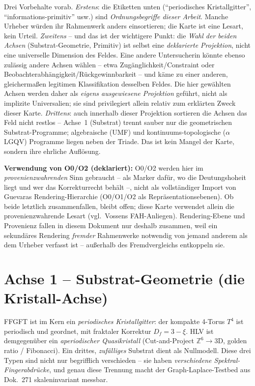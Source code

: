 Drei Vorbehalte vorab. \emph{Erstens}: die Etiketten unten (\enquote{periodisches Kristallgitter},
\enquote{informations-primitiv} usw.) sind \emph{Ordnungsbegriffe dieser Arbeit}. Manche
Urheber würden ihr Rahmenwerk anders einsortieren; die Karte ist eine Lesart, kein Urteil.
\emph{Zweitens} -- und das ist der wichtigere Punkt: die \emph{Wahl der beiden Achsen}
(Substrat-Geometrie, Primitiv) ist selbst eine \emph{deklarierte Projektion}, nicht eine
universelle Dimension des Feldes. Eine andere Untersucherin könnte ebenso zulässig andere
Achsen wählen -- etwa Zugänglichkeit/Constraint oder Beobachterabhängigkeit/Rückgewinnbarkeit
-- und käme zu einer anderen, gleichermaßen legitimen Klassifikation desselben Feldes. Die
hier gewählten Achsen werden daher als \emph{eigens ausgewiesene Projektion} geführt, nicht
als implizite Universalien; sie sind privilegiert allein relativ zum erklärten Zweck dieser
Karte. \emph{Drittens}: auch innerhalb dieser Projektion sortieren die Achsen das Feld nicht
restlos -- Achse~1 (Substrat) trennt sauber nur die geometrischen Substrat-Programme;
algebraische (UMF) und kontinuums-topologische ($\alpha$LGQV) Programme liegen neben der
Triade. Das ist kein Mangel der Karte, sondern ihre ehrliche Auflösung.

\medskip\noindent\textbf{Verwendung von O0/O2 (deklariert):} O0/O2 werden hier im
\emph{provenienzwahrenden} Sinn gebraucht -- als Marker dafür, wo die Deutungshoheit liegt
und wer das Korrekturrecht behält --, nicht als vollständiger Import von Guevaras
Rendering-Hierarchie (O0/O1/O2 als Repräsentationsebenen). Ob beide letztlich zusammenfallen,
bleibt offen; diese Karte verwendet allein die provenienzwahrende Lesart (vgl.\ Vossens
FAH-Anliegen). Rendering-Ebene und Provenienz fallen in diesem Dokument nur deshalb zusammen,
weil ein sekundäres Rendering \emph{fremder} Rahmenwerke notwendig von jemand anderem als dem
Urheber verfasst ist -- außerhalb des Fremdvergleichs entkoppeln sie.

\section{Achse 1 -- Substrat-Geometrie (die Kristall-Achse)}

FFGFT ist im Kern ein \emph{periodisches Kristallgitter}: der kompakte 4-Torus $T^4$ ist
periodisch und geordnet, mit fraktaler Korrektur $D_f=3-\xi$. HLV ist demgegenüber ein
\emph{aperiodischer Quasikristall} (Cut-and-Project $\mathbb{Z}^6\!\to\!3$D, golden ratio /
Fibonacci). Ein drittes, \emph{zufälliges} Substrat dient als Nullmodell. Diese drei Typen
sind nicht nur begrifflich verschieden -- sie haben \emph{verschiedene Spektral-Fingerabdrücke},
und genau diese Trennung macht der Graph-Laplace-Testbed aus Dok.~271 skaleninvariant messbar.

